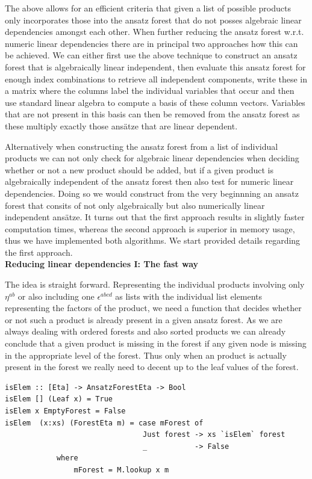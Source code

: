 \documentclass[a4paper,12pt, DIV=14, BCOR=5mm, twoside, headsepline]{scrbook}
\begin{document}
The above allows for an efficient criteria that given a list of possible products only incorporates those into the ansatz forest that do not posses algebraic linear dependencies amongst each other. When further reducing the ansatz forest w.r.t. numeric linear dependencies there are in principal two approaches how this can be achieved. We can either first use the above technique to construct an ansatz forest that is algebraically linear independent, then evaluate this ansatz forest for enough index combinations to retrieve all independent components, write these in a matrix where the columns label the individual variables that occur and then use standard linear algebra to compute a basis of these column vectors. Variables that are not present in this basis can then be removed from the ansatz forest as these multiply exactly those ansätze that are linear dependent. 

Alternatively when constructing the ansatz forest from a list of individual products we can not only check for algebraic linear dependencies when deciding whether or not a new product should be added, but if a given product is algebraically independent of the  ansatz forest then also test for numeric linear dependencies. Doing so we would construct from the very beginnning an ansatz forest that consits of not only algebraically but also numerically linear independent ansätze.
It turns out that the first approach results in slightly faster computation times, whereas the second approach is superior in memory usage, thus we have implemented both algorithms. 
We start provided details regarding the first approach. \\

\noindent \textbf{Reducing linear dependencies I:  The fast way}

The idea is straight forward. Representing the individual products involving only $\eta^{ab}$ or also including one $\epsilon^{abcd}$ as lists with the individual list elements representing the factors of the product, we need a function that decides whether or not such a product is already present in a given ansatz forest. As we are always dealing with ordered forests and also sorted products we can already conclude that a given product is missing in the forest if any given node is missing in the appropriate level of the forest. Thus only when an product is actually present in the forest we really need to decent up to the leaf values of the forest.

\begin{samepage}
\begin{verbatim}
isElem :: [Eta] -> AnsatzForestEta -> Bool
isElem [] (Leaf x) = True
isElem x EmptyForest = False
isElem  (x:xs) (ForestEta m) = case mForest of
                                Just forest -> xs `isElem` forest
                                _           -> False
            where
                mForest = M.lookup x m
\end{verbatim} 
\end{samepage}
\end{document}
